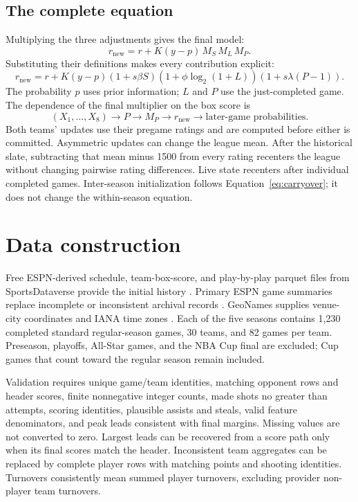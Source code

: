 \documentclass[11pt]{article}
\begin{document}
\subsection{The complete equation}
Multiplying the three adjustments gives the final model:
\begin{equation}\label{eq:update}
 \boxed{r_{\mathrm{new}}=r+K(y-p)\,M_S\,M_L\,M_P}.
\end{equation}
Substituting their definitions makes every contribution explicit:
\begin{equation}\label{eq:update-expanded}
 \boxed{r_{\mathrm{new}}=r+K(y-p)
 (1+s\beta S)(1+\phi\log_2(1+L))(1+s\lambda(P-1))}.
\end{equation}
The probability $p$ uses prior information; $L$ and $P$ use the just-completed
game. The dependence of the final multiplier on the box score is
\begin{equation}
 (X_1,\ldots,X_8)\longrightarrow P\longrightarrow M_P
 \longrightarrow r_{\mathrm{new}}\longrightarrow
 \text{later-game probabilities}.
\end{equation}
Both teams' updates use their pregame ratings and are computed before either
is committed. Asymmetric updates can change the league mean. After the
historical slate, subtracting that mean minus 1500 from every rating recenters
the league without changing pairwise rating differences. Live state recenters
after individual completed games. Inter-season initialization follows
Equation~\eqref{eq:carryover}; it does not change the within-season equation.

\section{Data construction}
Free ESPN-derived schedule, team-box-score, and play-by-play parquet files from
SportsDataverse provide the initial history \cite{sportsdataverse}. Primary
ESPN game summaries replace incomplete or inconsistent archival records
\cite{espn}. GeoNames supplies venue-city coordinates and IANA time zones
\cite{geonames}. Each of the five seasons contains 1,230 completed standard
regular-season games, 30 teams, and 82 games per team. Preseason, playoffs,
All-Star games, and the NBA Cup final are excluded; Cup games that count
toward the regular season remain included.

Validation requires unique game/team identities, matching opponent rows and
header scores, finite nonnegative integer counts, made shots no greater than
attempts, scoring identities, plausible assists and steals, valid feature
denominators, and peak leads consistent with final margins. Missing values
are not converted to zero. Largest leads can be recovered from a score path
only when its final scores match the header. Inconsistent team aggregates
can be replaced by complete player rows with matching points and shooting
identities. Turnovers consistently mean summed player turnovers, excluding
provider non-player team turnovers.
\end{document}
